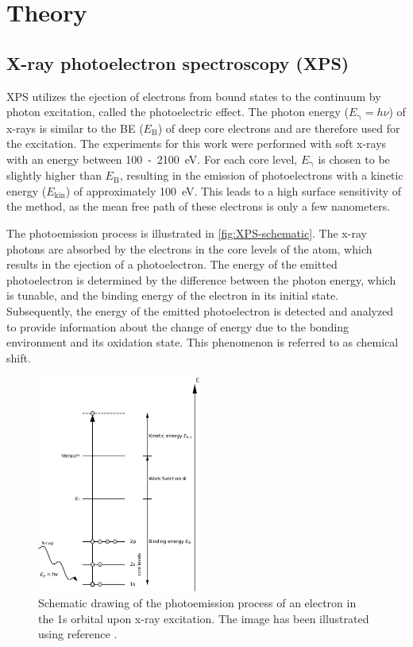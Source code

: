 \chapter{Theory}
\section{X-ray photoelectron spectroscopy (XPS)}

\Acf{XPS} utilizes the ejection of electrons from bound states to the continuum by photon excitation, called the photoelectric effect.\autocite{Hertz1887, Einstein1905} The photon energy ($E_\mathrm{\gamma}=h\nu$) of x-rays is similar to the \acl{BE} ($E_\mathrm{B}$) of deep core electrons and are therefore used for the excitation. The experiments for this work were performed with soft x-rays with an energy between 100~-~2100~\si{\eV}. For each core level, $E_\mathrm{\gamma}$ is chosen to be slightly higher than $E_\mathrm{B}$, resulting in the emission of photoelectrons with a kinetic energy ($E_\mathrm{kin}$) of approximately 100~\si{\eV}. This leads to a high surface sensitivity of the method, as the mean free path of these electrons is only a few nanometers.\autocite{Fairley2021}

The photoemission process is illustrated in \autoref{fig:XPS-schematic}. The x-ray photons are absorbed by the electrons in the core levels of the atom, which results in the ejection of a photoelectron. The energy of the emitted photoelectron is determined by the difference between the photon energy, which is tunable, and the binding energy of the electron in its initial state. Subsequently, the energy of the emitted photoelectron is detected and analyzed to provide information about the change of energy due to the bonding environment and its oxidation state. This phenomenon is referred to as chemical shift.\autocite{Kolasinski2012}

\begin{figure}[htb]
	\centering
	\includegraphics[width=0.48\textwidth]{images/XPS_schematic.png}
	\caption{Schematic drawing of the photoemission process of an electron in the 1s orbital upon x-ray excitation. The image has been illustrated using reference \cite{Attard1998}.}
	\label{fig:XPS-schematic}
\end{figure}

